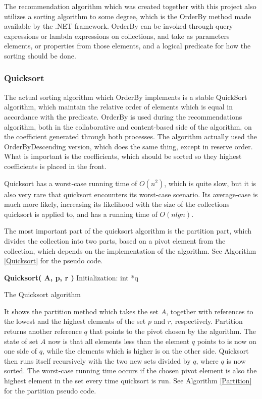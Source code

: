 The recommendation algorithm which was created together with this project also utilizes a sorting algorithm to some degree, which is the OrderBy method made available by the .NET framework. OrderBy can be invoked through query expressions or lambda expressions on collections, and take as parameters elements, or properties from those elements, and a logical predicate for how the sorting should be done. \cite{AlgoAnal1}

\subsubsection{Quicksort}

The actual sorting algorithm which OrderBy implements is a stable QuickSort algorithm, which maintain the relative order of elements which is equal in accordance with the predicate. OrderBy is used during the recommendations algorithm, both in the collaborative and content-based side of the algorithm, on the coefficient generated through both processes. The algorithm actually used the OrderByDescending version, which does the same thing, except in reserve order. What is important is the coefficients, which should be sorted so they highest coefficients is placed in the front.

Quicksort has a worst-case running time of $O(n^2)$, which is quite slow, but it is also very rare that quicksort encounters its worst-case scenario. Its average-case is much more likely, increasing its likelihood with the size of the collections quicksort is applied to, and has a running time of $O(nlgn)$.

The most important part of the quicksort algorithm is the partition part, which divides the collection into two parts, based on a pivot element from the collection, which depends on the implementation of the algorithm. See Algorithm \ref{Quicksort} for the pseudo code.

\begin{algorithm}
	\DontPrintSemicolon
	\textbf{Quicksort( A, p, r )}\;
	Initialization:\;
	int *q\;
	\label{Quicksort}
	\caption{The Quicksort algorithm}
\end{algorithm}

It shows the partition method which takes the set $A$, together with references to the lowest and the highest elements of the set $p$ and $r$, respectively. Partition returns another reference $q$ that points to the pivot chosen by the algorithm. The state of set $A$ now is that all elements less than the element $q$ points to is now on one side of $q$, while the elements which is higher is on the other side. Quicksort then runs itself recursively with the two new sets divided by $q$, where $q$ is now sorted. The worst-case running time occurs if the chosen pivot element is also the highest element in the set every time quicksort is run. See Algorithm \ref{Partition} for the partition pseudo code.

